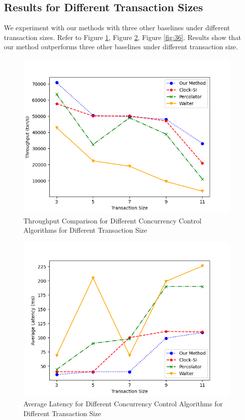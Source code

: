 \subsection{Results for Different Transaction Sizes}
We experiment with our methods with three other baselines under different transaction sizes. Refer to Figure \ref{fig:34}, Figure \ref{fig:35}, Figure \ref{fig:36}. Results show that our method outperforms three other baselines under different transaction size.

\begin{figure}[H]
    \centering
    \includegraphics[width=0.8\linewidth]{figure/34.png}
    \caption{Throughput Comparison for Different Concurrency Control Algorithms for Different Transaction Size}
    \label{fig:34}
\end{figure}
\begin{figure}[H]
    \centering
    \includegraphics[width=0.8\linewidth]{figure/35.png}
    \caption{Average Latency for Different Concurrency Control Algorithms for Different Transaction Size}
    \label{fig:35}
\end{figure}
